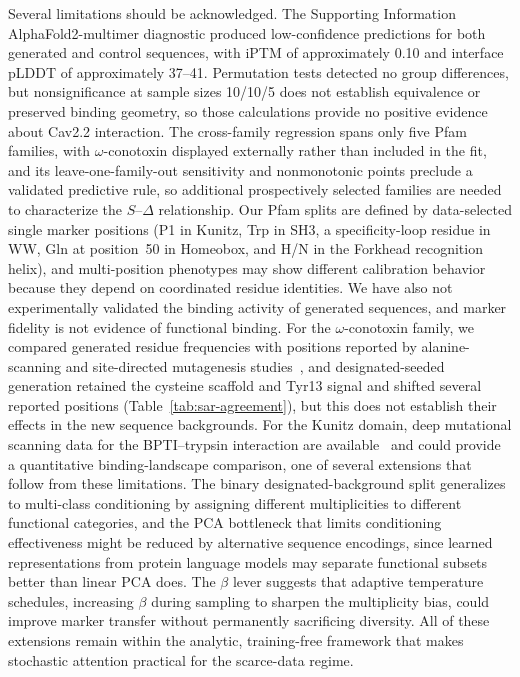 Several limitations should be acknowledged. The Supporting Information AlphaFold2-multimer
diagnostic produced
low-confidence predictions for both generated and control sequences, with iPTM of
approximately 0.10 and interface pLDDT of approximately 37--41. Permutation tests detected no
group differences, but nonsignificance at sample sizes 10/10/5 does not establish equivalence
or preserved binding geometry, so those calculations provide no positive evidence about Cav2.2
interaction. The cross-family regression spans only five Pfam families, with
$\omega$-conotoxin displayed externally rather than included in the fit, and its
leave-one-family-out sensitivity and nonmonotonic points preclude a validated predictive rule,
so additional prospectively selected families are needed to characterize the
$S$--$\Delta$ relationship. Our Pfam splits are defined by data-selected single marker
positions (P1 in Kunitz, Trp in SH3, a specificity-loop residue in WW, Gln at position~50 in
Homeobox, and H/N in the Forkhead recognition helix), and multi-position phenotypes may show
different calibration behavior because they depend on coordinated residue identities. We have
also not experimentally validated the binding activity of generated sequences, and marker
fidelity is not evidence of functional binding. For the $\omega$-conotoxin family, we compared
generated residue frequencies with positions reported by alanine-scanning and site-directed
mutagenesis studies~\cite{kimTyr13Essential1995,satoBasicResidues1993,lewisConotoxinSAR2012},
and designated-seeded generation retained the cysteine scaffold and Tyr13 signal and shifted
several reported positions (Table~\ref{tab:sar-agreement}), but this does not establish their
effects in the new sequence backgrounds. For the Kunitz domain, deep mutational scanning data
for the BPTI--trypsin interaction are available~\cite{heyneBPTIDMS2021} and could provide
a quantitative binding-landscape comparison, one of several extensions that follow from these
limitations. The binary
designated-background split generalizes to multi-class conditioning by assigning different
multiplicities to different functional categories, and the PCA bottleneck that limits
conditioning effectiveness might be reduced by alternative sequence encodings, since learned
representations from protein language models may separate functional subsets better than
linear PCA does. The $\beta$ lever suggests that adaptive temperature schedules, increasing
$\beta$ during sampling to sharpen the multiplicity bias, could improve marker transfer
without permanently sacrificing diversity. All of these extensions remain within the analytic,
training-free framework that makes stochastic attention practical for the scarce-data regime.
